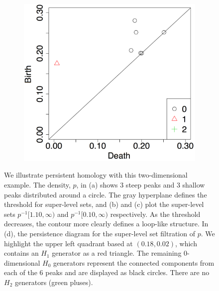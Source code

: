 \documentclass[12pt]{article}
\begin{document}
\begin{figure}
\begin{subfigure}{.25\linewidth}
    \label{fig:example_contour2}
  \end{subfigure}
    \begin{subfigure}{.20\linewidth}
    \centering
    \caption{}
        \includegraphics[width=\linewidth]{figure_2_pd.pdf}
    \label{fig:example_pd}
  \end{subfigure}
  \caption{ We illustrate persistent homology with this two-dimensional example. The density, $p$, in (a) shows 3 steep peaks and 3 shallow peaks  distributed around a circle. The gray hyperplane defines the threshold for super-level sets, and (b) and (c) plot the super-level sets $p^{-1}[1.10,\infty)$ and $p^{-1}[0.10,\infty)$ respectively. As the threshold decreases, the contour more clearly defines a loop-like structure. In (d), the persistence diagram for the super-level set filtration of $p$. We highlight the upper left quadrant based at $(0.18, 0.02)$, which contains an $H_1$ generator as a red triangle. The remaining 0-dimensional $H_0$ generators represent the connected components from each of the 6 peaks and are displayed as black circles.  There are no $H_2$ generators (green pluses).
  } %
    \label{fig:homologyexample}
\end{figure}
\end{document}
